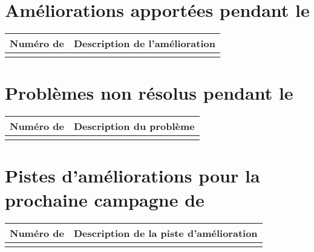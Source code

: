 
\section*{Améliorations apportées pendant le \PICCourt}

\begin{table}[H]
\centering
	\begin{tabularx}{16.8cm}{|p{4cm}|X|}
	\hline
	\rowcolor{gray!40} Numéro de \FTCourt & Description de l'amélioration \\
	\hline
	 & \\
	 \hline
	\end{tabularx}
\end{table}

\section*{Problèmes non résolus pendant le \PICCourt}

\begin{table}[H]
\centering
	\begin{tabularx}{16.8cm}{|p{4cm}|X|}
	\hline
	\rowcolor{gray!40} Numéro de \FTCourt & Description du problème \\
	\hline
	 & \\
	 \hline
	\end{tabularx}
\end{table}

\section*{Pistes d'améliorations pour la prochaine campagne de \PICCourt}

\begin{table}[H]
\centering
	\begin{tabularx}{16.8cm}{|p{4cm}|X|}
	\hline
	\rowcolor{gray!40} Numéro de \FTCourt & Description de la piste d'amélioration \\
	\hline
	 & \\
	 \hline
	\end{tabularx}
\end{table}